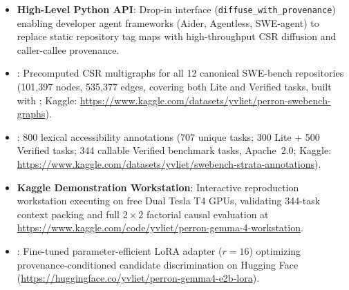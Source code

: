 \documentclass[10pt]{article}
\begin{document}
\begin{itemize}[noitemsep,topsep=2pt,parsep=0pt,partopsep=0pt]
    \item \textbf{High-Level Python API}: Drop-in interface (\texttt{diffuse\_with\_provenance}) enabling developer agent frameworks (Aider, Agentless, SWE-agent) to replace static repository tag maps with high-throughput CSR diffusion and caller-callee provenance.
    \item \textbf{}: Precomputed CSR multigraphs for all 12 canonical SWE-bench repositories (101,397 nodes, 535,377 edges, covering both Lite and Verified tasks, built with ; Kaggle: \url{https://www.kaggle.com/datasets/yvliet/perron-swebench-graphs}).
    \item \textbf{}: 800 lexical accessibility annotations (707 unique tasks; 300 Lite + 500 Verified tasks; 344 callable Verified benchmark tasks, Apache~2.0; Kaggle: \url{https://www.kaggle.com/datasets/yvliet/swebench-strata-annotations}).
    \item \textbf{Kaggle Demonstration Workstation}: Interactive reproduction workstation executing on free Dual Tesla T4 GPUs, validating 344-task context packing and full $2 \times 2$ factorial causal evaluation at \url{https://www.kaggle.com/code/yvliet/perron-gemma-4-workstation}.
    \item \textbf{}: Fine-tuned parameter-efficient LoRA adapter ($r=16$) optimizing provenance-conditioned candidate discrimination on Hugging Face (\url{https://huggingface.co/yvliet/perron-gemma4-e2b-lora}).
\end{itemize}


\end{document}
